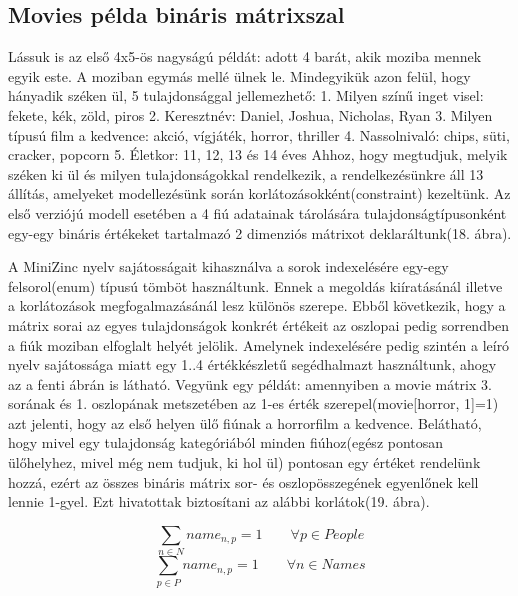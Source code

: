 \documentclass[12pt,a4paper,twoside, openright]{report}
\begin{document}
\subsection{Movies példa bináris mátrixszal}

    Lássuk is az első 4x5-ös nagyságú példát: adott 4 barát, akik moziba mennek egyik este.
    A moziban egymás mellé ülnek le.
    Mindegyikük azon felül, hogy hányadik széken ül, 5 tulajdonsággal jellemezhető: 
    1.	Milyen színű inget visel: fekete, kék, zöld, piros
    2.	Keresztnév: Daniel, Joshua, Nicholas, Ryan
    3.	Milyen típusú film a kedvence: akció, vígjáték, horror, thriller
    4.	Nassolnivaló: chips, süti, cracker, popcorn
    5.	Életkor: 11, 12, 13 és 14 éves
    Ahhoz, hogy megtudjuk, melyik széken ki ül és milyen tulajdonságokkal rendelkezik, a rendelkezésünkre áll 13 állítás, amelyeket modellezésünk során korlátozásokként(constraint) kezeltünk.
    Az első verziójú modell esetében a 4 fiú adatainak tárolására tulajdonságtípusonként egy-egy bináris értékeket tartalmazó 2 dimenziós mátrixot deklaráltunk(18. ábra).


    A MiniZinc nyelv sajátosságait kihasználva a sorok indexelésére egy-egy felsorol(enum) típusú tömböt használtunk.
    Ennek a megoldás kiíratásánál illetve a korlátozások megfogalmazásánál lesz különös szerepe.
    Ebből következik, hogy a mátrix sorai az egyes tulajdonságok konkrét értékeit az oszlopai pedig sorrendben a fiúk moziban elfoglalt helyét jelölik.
    Amelynek indexelésére pedig szintén a leíró nyelv sajátossága miatt egy {1..4} értékkészletű segédhalmazt használtunk, ahogy az a fenti ábrán is látható.
    Vegyünk egy példát: amennyiben a movie mátrix 3. sorának és 1. oszlopának metszetében az 1-es érték szerepel(movie[horror, 1]=1) azt jelenti, hogy az első helyen ülő fiúnak a horrorfilm a kedvence.
    Belátható, hogy mivel egy tulajdonság kategóriából minden fiúhoz(egész pontosan ülőhelyhez, mivel még nem tudjuk, ki hol ül) pontosan egy értéket rendelünk hozzá, ezért az összes bináris mátrix sor- és oszlopösszegének egyenlőnek kell lennie 1-gyel.
    Ezt hivatottak biztosítani az alábbi korlátok(19. ábra).

    \begin{equation}
    \sum_{n\in N} name_{n,p} =1 \qquad \forall p \in People
    \end{equation}
    \begin{equation}
    \sum_{p\in P} name_{n,p} =1 \qquad \forall n \in Names
    \end{equation}
\end{document}
